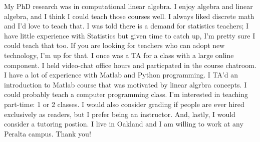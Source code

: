\documentclass{article}
\begin{document}
My PhD research was in computational linear algebra.  I enjoy algebra and linear algebra, and I think I could teach those courses well.  I always liked discrete math and I'd love to teach that.  I was told there is a demand for statistics teachers; I have little experience with Statistics but given time to catch up, I'm pretty sure I could teach that too.  If you are looking for teachers who can adopt new technology, I'm up for that.   I once was a TA for a class with a large online component.  I held video-chat office hours and particpated in the course chatroom.  I have a lot of experience with Matlab and Python programming.  I TA'd an introduction to Matlab course that was motivated by linear algrbra concepts.   I could probably teach a computer programming class.
I'm interested in teaching part-time: 1 or 2 classes.  I would also consider grading if people are ever hired exclusively as readers, but I prefer being an instructor.  And, lastly, I would consider a tutoring postion.  I live in Oakland and I am willing to work at any Peralta campus.   Thank you!
\end{document}
